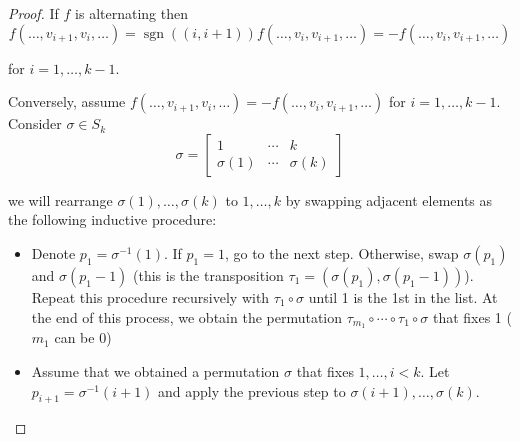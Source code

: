 \begin{proof}
    If \( f \) is alternating then
    \[
        f(\ldots, v_{i+1}, v_{i}, \ldots) = \operatorname{sgn}((i,i+1)) f(\ldots, v_{i}, v_{i+1}, \ldots) = -f(\ldots, v_{i}, v_{i+1}, \ldots)
    \]

    for \( i = 1, \ldots, k-1 \).

    Conversely, assume \( f(\ldots, v_{i+1}, v_{i}, \ldots) = -f(\ldots, v_{i}, v_{i+1}, \ldots) \) for \( i = 1, \ldots, k-1 \). Consider \( \sigma \in S_{k} \)
    \[
        \sigma = \begin{bmatrix}
            1         & \cdots & k         \\
            \sigma(1) & \cdots & \sigma(k)
        \end{bmatrix}
    \]

    we will rearrange \( \sigma(1), \ldots, \sigma(k) \) to \( 1, \ldots, k \) by swapping adjacent elements as the following inductive procedure:
    \begin{itemize}
        \item Denote \( p_{1} = \sigma^{-1}(1) \). If \( p_{1} = 1 \), go to the next step. Otherwise, swap \( \sigma(p_{1}) \) and \( \sigma(p_{1} - 1) \) (this is the transposition \( \tau_{1} = (\sigma(p_{1}), \sigma(p_{1} - 1)) \)). Repeat this procedure recursively with \( \tau_{1} \circ \sigma \) until 1 is the 1st in the list. At the end of this process, we obtain the permutation \( \tau_{m_{1}}\circ \cdots \circ \tau_{1}\circ \sigma \) that fixes 1 (\( m_{1}\) can be 0)
        \item Assume that we obtained a permutation \( \sigma \) that fixes \( 1, \ldots, i < k \). Let \( p_{i+1} = \sigma^{-1}(i + 1) \) and apply the previous step to \( \sigma(i+1), \ldots, \sigma(k) \).
    \end{itemize}


\end{proof}
